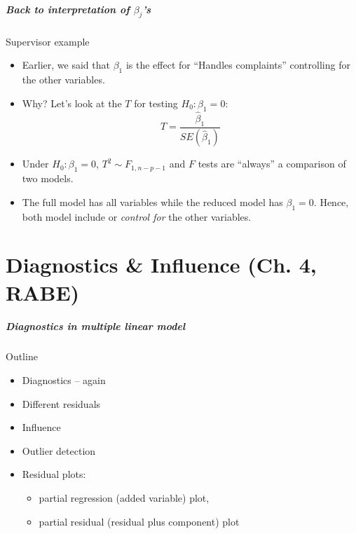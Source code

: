 \documentclass[handout]{beamer}
\begin{document}

   \begin{frame} \frametitle{Back to interpretation of $\beta_j$'s}

   \begin{block}
   {Supervisor example}
   \begin{itemize}

   \item Earlier, we said that $\beta_1$ is the effect
   for  ``Handles complaints'' controlling for the other variables.

   \item Why? Let's look at the $T$ for testing $H_0:\beta_1=0$:
   $$
   T = \frac{\widehat{\beta}_1}{SE(\widehat{\beta}_1)}
   $$
   \item Under $H_0:\beta_1=0$, $T^2 \sim F_{1, n-p-1}$ and
   $F$ tests are ``always'' a comparison of two models.

   \item The full model has all variables while the reduced model
   has $\beta_1=0$. Hence, both model include or {\em control for}
   the other variables.

   \end{itemize}
   \end{block}
   \end{frame}

   \part{Diagnostics \& Influence  (Ch. 4, RABE)}
   \frame{\partpage}


   \begin{frame} \frametitle{Diagnostics in multiple linear model}

   \begin{block}
   {Outline}
   \begin{itemize}

   \item Diagnostics -- again
   \item Different residuals


   \item Influence

   \item Outlier detection

   \item Residual plots:
   \begin{itemize}
   \item partial regression (added variable) plot,

   \item partial residual (residual plus component) plot
   \end{itemize}
   \end{itemize}
   \end{block}
   \end{frame}
\end{document}
